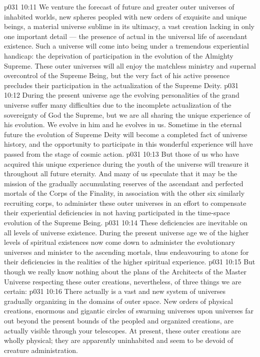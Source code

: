 \vs p031 10:11 We venture the forecast of future and greater outer universes of inhabited worlds, new spheres peopled with new orders of exquisite and unique beings, a material universe sublime in its ultimacy, a vast creation lacking in only one important detail --- the presence of actual  in the universal life of ascendant existence. Such a universe will come into being under a tremendous experiential handicap: the deprivation of participation in the evolution of the Almighty Supreme. These outer universes will all enjoy the matchless ministry and supernal overcontrol of the Supreme Being, but the very fact of his active presence precludes their participation in the actualization of the Supreme Deity.
\vs p031 10:12 During the present universe age the evolving personalities of the grand universe suffer many difficulties due to the incomplete actualization of the sovereignty of God the Supreme, but we are all sharing the unique experience of his evolution. We evolve in him and he evolves in us. Sometime in the eternal future the evolution of Supreme Deity will become a completed fact of universe history, and the opportunity to participate in this wonderful experience will have passed from the stage of cosmic action.
\vs p031 10:13 But those of us who have acquired this unique experience during the youth of the universe will treasure it throughout all future eternity. And many of us speculate that it may be the mission of the gradually accumulating reserves of the ascendant and perfected mortals of the Corps of the Finality, in association with the other six similarly recruiting corps, to administer these outer universes in an effort to compensate their experiential deficiencies in not having participated in the time\hyp{}space evolution of the Supreme Being.
\vs p031 10:14 These deficiencies are inevitable on all levels of universe existence. During the present universe age we of the higher levels of spiritual existences now come down to administer the evolutionary universes and minister to the ascending mortals, thus endeavouring to atone for their deficiencies in the realities of the higher spiritual experience.
\vs p031 10:15 But though we really know nothing about the plans of the Architects of the Master Universe respecting these outer creations, nevertheless, of three things we are certain:
\vs p031 10:16 \bibnobreakspace There actually is a vast and new system of universes gradually organizing in the domains of outer space. New orders of physical creations, enormous and gigantic circles of swarming universes upon universes far out beyond the present bounds of the peopled and organized creations, are actually visible through your telescopes. At present, these outer creations are wholly physical; they are apparently uninhabited and seem to be devoid of creature administration.
